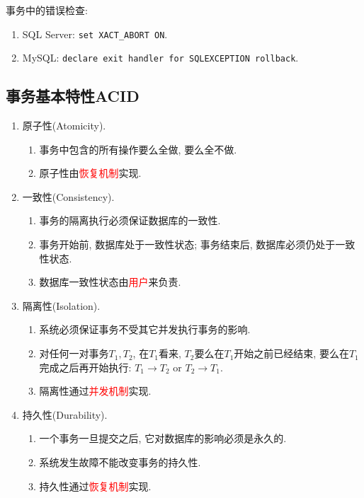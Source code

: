 事务中的错误检查:
\begin{enumerate}
    \item SQL Server: \verb|set XACT_ABORT ON|.
    \item MySQL: \verb|declare exit handler for SQLEXCEPTION rollback|.
\end{enumerate}

\subsection{事务基本特性ACID}

\begin{enumerate}
    \item 原子性(Atomicity).
    \begin{enumerate}
        \item 事务中包含的所有操作要么全做, 要么全不做.
        \item 原子性由\textcolor{red}{恢复机制}实现.
    \end{enumerate}
    \item 一致性(Consistency).
    \begin{enumerate}
        \item 事务的隔离执行必须保证数据库的一致性.
        \item 事务开始前, 数据库处于一致性状态; 事务结束后, 数据库必须仍处于一致性状态.
        \item 数据库一致性状态由\textcolor{red}{用户}来负责.
    \end{enumerate}
    \item 隔离性(Isolation).
    \begin{enumerate}
        \item 系统必须保证事务不受其它并发执行事务的影响.
        \item 对任何一对事务$T_1,T_2$, 在$T_1$看来, $T_2$要么在$T_1$开始之前已经结束, 要么在$T_1$完成之后再开始执行: $T_1\to T_2 \text{ or } T_2\to T_1$.
        \item 隔离性通过\textcolor{red}{并发机制}实现.
    \end{enumerate}
    \item 持久性(Durability).
    \begin{enumerate}
        \item 一个事务一旦提交之后, 它对数据库的影响必须是永久的.
        \item 系统发生故障不能改变事务的持久性.
        \item 持久性通过\textcolor{red}{恢复机制}实现.
    \end{enumerate}
\end{enumerate}

